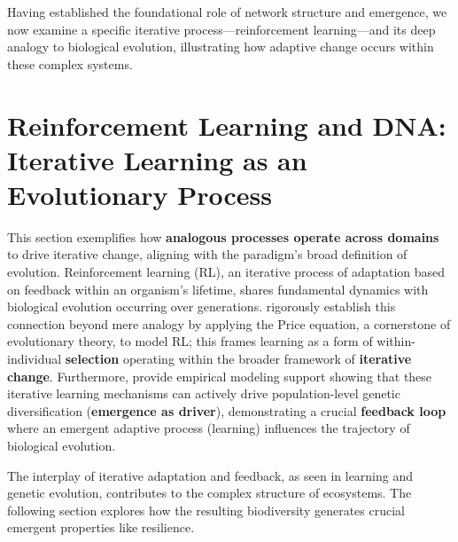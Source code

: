 Having established the foundational role of network structure and emergence, we now examine a specific iterative process—reinforcement learning—and its deep analogy to biological evolution, illustrating how adaptive change occurs within these complex systems.

\section{Reinforcement Learning and DNA: Iterative Learning as an Evolutionary Process} \label{sec:rl_dna}
This section exemplifies how \textbf{analogous processes operate across domains} to drive iterative change, aligning with the paradigm's broad definition of evolution. Reinforcement learning (RL), an iterative process of adaptation based on feedback within an organism's lifetime, shares fundamental dynamics with biological evolution occurring over generations. \citet{borgstede2021reinforcement} rigorously establish this connection beyond mere analogy by applying the Price equation, a cornerstone of evolutionary theory, to model RL; this frames learning as a form of within-individual \textbf{selection} operating within the broader framework of \textbf{iterative change}. Furthermore, \citet{mcnamara2024reinforcement} provide empirical modeling support showing that these iterative learning mechanisms can actively drive population-level genetic diversification (\textbf{emergence as driver}), demonstrating a crucial \textbf{feedback loop} where an emergent adaptive process (learning) influences the trajectory of biological evolution.

The interplay of iterative adaptation and feedback, as seen in learning and genetic evolution, contributes to the complex structure of ecosystems. The following section explores how the resulting biodiversity generates crucial emergent properties like resilience.

